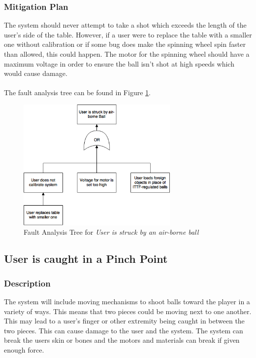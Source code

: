 \documentclass[11pt]{article}
\begin{document}
\subsubsection*{Mitigation Plan}
The system should never attempt to take a shot which exceeds the length of the user's side of the table. However, if a user were to replace the table with a smaller one without calibration or if some bug does make the spinning wheel spin faster than allowed, this could happen. The motor for the spinning wheel should have a maximum voltage in order to ensure the ball isn't shot at high speeds which would cause damage. \\ \\
The fault analysis tree can be found in Figure \ref{fig:ft-Air}.
\begin{figure}[H]
   \centering
   \includegraphics[width=0.7\textwidth]{img/ft-Air.png} %
   \caption{Fault Analysis Tree for \textit{User is struck by an air-borne ball}}
   \label{fig:ft-Air} %
\end{figure}

\subsection{User is caught in a Pinch Point}
\subsubsection*{Description}
The system will include moving mechanisms to shoot balls toward the player in a variety of ways. This means that two pieces could be moving next to one another. This may lead to a user's finger or other extremity being caught in between the two pieces. This can cause damage to the user and the system. The system can break the users skin or bones and the motors and materials can break if given enough force.
\end{document}
